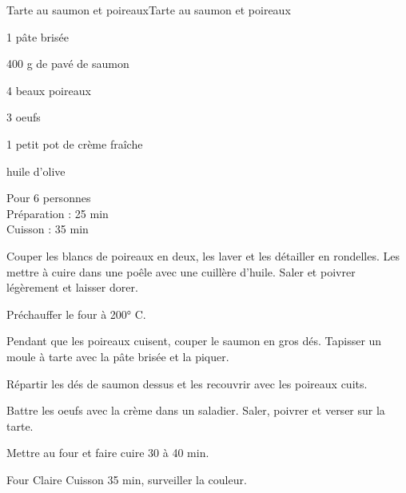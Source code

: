 \begin{recette}{Tarte au saumon et poireaux}{Tarte au saumon et poireaux}

\begin{ingredients}
1 pâte brisée\par
400 g de pavé de saumon\par
4 beaux poireaux\par
3 oeufs\par
1 petit pot de crème fraîche\par
huile d'olive\par
\end{ingredients}

\begin{infos}
Pour 6 personnes\\
Préparation : 25 min\\
Cuisson : 35 min\\
\end{infos}

\begin{etapes}
\item Couper les blancs de poireaux en deux, les laver et les détailler en rondelles. Les mettre à cuire dans une poêle avec une cuillère d'huile. Saler et poivrer légèrement et laisser dorer.
\item Préchauffer le four à 200° C.
\item Pendant que les poireaux cuisent, couper le saumon en gros dés. Tapisser un moule à tarte avec la pâte brisée et la piquer.
\item Répartir les dés de saumon dessus et les recouvrir avec les poireaux cuits.
\item Battre les oeufs avec la crème dans un saladier. Saler, poivrer et verser sur la tarte.
\item Mettre au four et faire cuire 30 à 40 min.
\end{etapes}

\begin{conseils}
Four Claire Cuisson 35 min, surveiller la couleur.
\end{conseils}

\end{recette}
